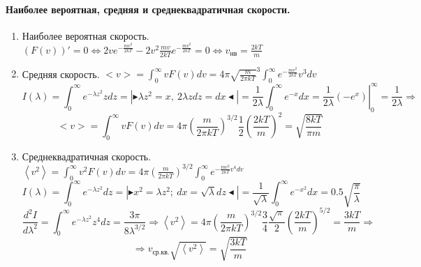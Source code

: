 \paragraph{Наиболее вероятная, средняя и среднеквадратичная скорости.} 
\begin{enumerate}
	\item Наиболее вероятная скорость. $(F(v))'=0\Leftrightarrow2ve^{-\frac{mv^2}{2kT}}-2v^2\frac{mv}{2kT}e^{-\frac{mv^2}{2kT}}=0\Leftrightarrow v_\text{нв}=\frac{2kT}{m}$
	\item Средняя скорость.
	 $<v>=\int_{0}^{\infty}vF(v)dv=4\pi\sqrt{\frac{m}{2\pi kT}}^3\int_{0}^{\infty}e^{-\frac{mv^2}{2kT}}v^3dv$
	 \[I(\lambda)=\int_{0}^{\infty}e^{-\lambda z^2}zdz=\left|\blacktriangleright \lambda z^2=x,\ 2\lambda zdz=dx \blacktriangleleft\right|=\dfrac{1}{2\lambda}\int_{0}^{\infty}e^{-x}dx=\left.\frac{1}{2\lambda}(-e^x)\right|_0^\infty=\frac{1}{2\lambda} \Rightarrow\]
	 \[<v>=\int_{0}^{\infty}vF(v)dv=4\pi\left(\frac{m}{2\pi kT}\right)^{3/2}\frac{1}{2}\left(\frac{2kT}{m}\right)^2=\sqrt{\frac{8kT}{\pi m}} \]
	 \item Среднеквадратичная скорость. $\left< v^2 \right>=\int_{0}^{\infty}v^2F(v)dv=4\pi\left(\frac{m}{2\pi kT}\right)^{3/2}\int_{0}^{\infty}e^{-\frac{mv^2}{2kT}v^4dv}$
	 \[ I(\lambda)=\int_{0}^{\infty}e^{-\lambda z^2}dz=\left|\blacktriangleright x^2=\lambda z^2;\ dx=\sqrt{\lambda}dz \blacktriangleleft\right|=\frac{1}{\sqrt{\lambda}}\int_{0}^{\infty}e^{-x^2}dx=0.5\sqrt{\frac{\pi}{\lambda}}\]
	 \[\frac{d^2 I}{d\lambda^2}=\int_{0}^{\infty}e^{-\lambda z^2}z^4dz=\frac{3\pi}{8\lambda^{3/2}}\Rightarrow \left< v^2 \right>=4\pi\left(\frac{m}{2\pi kT}\right)^{3/2}\frac{3}{4}\frac{\sqrt{\pi}}{2}\left(\frac{2kT}{m}\right)^{5/2} =\frac{3kT}{m}\Rightarrow\] \[\Rightarrow v_\text{ср.кв.}\sqrt{\left< v^2\right>}=\sqrt{\frac{3kT}{m}} \]
	\end{enumerate}